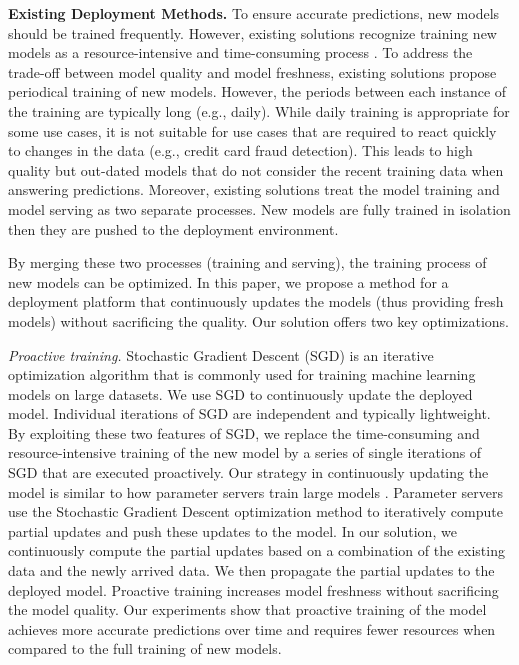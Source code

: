 \textbf{Existing Deployment Methods.} 
To ensure accurate predictions, new models should be trained frequently.
However, existing solutions recognize training new models as a resource-intensive and time-consuming process \cite{crankshaw2014missing, agarwal2014laser, baylor2017tfx}.
To address the trade-off between model quality and model freshness, existing solutions propose periodical training of new models.
However, the periods between each instance of the training are typically long (e.g., daily).
While daily training is appropriate for some use cases, it is not suitable for use cases that are required to react quickly to changes in the data (e.g., credit card fraud detection).
This leads to high quality but out-dated models that do not consider the recent training data when answering predictions.
Moreover, existing solutions treat the model training and model serving as two separate processes. 
New models are fully trained in isolation then they are pushed to the deployment environment.

By merging these two processes (training and serving), the training process of new models can be optimized.
In this paper, we propose a method for a deployment platform that continuously updates the models (thus providing fresh models) without sacrificing the quality.
Our solution offers two key optimizations.

\textit{Proactive training.}
Stochastic Gradient Descent (SGD) is an iterative optimization algorithm that is commonly used for training machine learning models on large datasets.
We use SGD to continuously update the deployed model.
Individual iterations of SGD are independent and typically lightweight.
By exploiting these two features of SGD, we replace the time-consuming and resource-intensive training of the new model by a series of single iterations of SGD that are executed proactively.
Our strategy in continuously updating the model is similar to how parameter servers train large models \cite{li2014scaling}.
Parameter servers use the Stochastic Gradient Descent optimization method to iteratively compute partial updates and push these updates to the model.
In our solution, we continuously compute the partial updates based on a combination of the existing data and the newly arrived data.
We then propagate the partial updates to the deployed model.
Proactive training increases model freshness without sacrificing the model quality.
Our experiments show that proactive training of the model achieves more accurate predictions over time and requires fewer resources when compared to the full training of new models.

